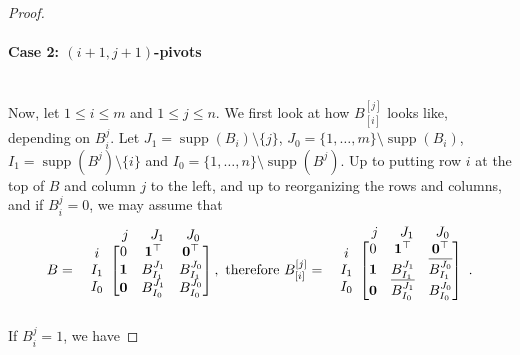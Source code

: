 \documentclass[11pt,a4paper]{amsart}
\renewcommand*{\leq}{\leqslant}
\theoremstyle{plain}
\theoremstyle{definition}
\DeclareMathOperator{\supp}{supp}
\begin{document}
\begin{proof}
\paragraph*{\textbf{Case 2: $(i+1,j+1)$-pivots}}~\\
Now, let $1\leq i\leq m$ and $1\leq j\leq n$. We first look at how $B_{[i]}^{[j]}$ looks like, depending on $B_i^j$.
\renewcommand{\arraystretch}{1.5}
Let $J_1=\supp(B_i)\setminus \{j\}$, $J_0 =\{1,\ldots,m\}\setminus \supp(B_i)$, $I_1=\supp(B^j)\setminus\{i\}$ and $I_0 =\{1,\ldots,n\}\setminus \supp(B^j)$.
Up to putting row $i$ at the top of $B$ and column $j$ to the left, and up to reorganizing the rows and columns, and if $B_i^j=0$, we may assume that
$$B=\begin{array}{c@{}c}
& \begin{array}{lcc}
	j\;\; & J_1\;\;& J_0
\end{array}\\
\begin{array}{c}
	i\\I_1 \\ I_0
\end{array} &\begin{bmatrix}
	0 &\mathbf{1}^\top & \mathbf{0}^\top\\
	\mathbf{1} & B_{I_1}^{J_1} & B_{I_1}^{J_0} \\
	\mathbf{0} & B_{I_0}^{J_1} & B_{I_0}^{J_0} \\
\end{bmatrix}\\&\end{array}\!\!, \text{ therefore } B_{[i]}^{[j]}=\begin{array}{c@{}c}
& \begin{array}{lcc}
	j\;\; & J_1\;\; & J_0
\end{array}\\
\begin{array}{c}
	i\\I_1 \\ I_0
\end{array} &\begin{bmatrix}
	0 &\mathbf{1}^\top & \mathbf{0}^\top\\
	\mathbf{1} & B_{I_1}^{J_1} & \overline{B_{I_1}^{J_0}} \\
	\mathbf{0} & \overline{B_{I_0}^{J_1}} & B_{I_0}^{J_0} \\
\end{bmatrix}\\&\end{array}.$$
If $B_i^j=1$, we have 

\end{proof}
\end{document}
